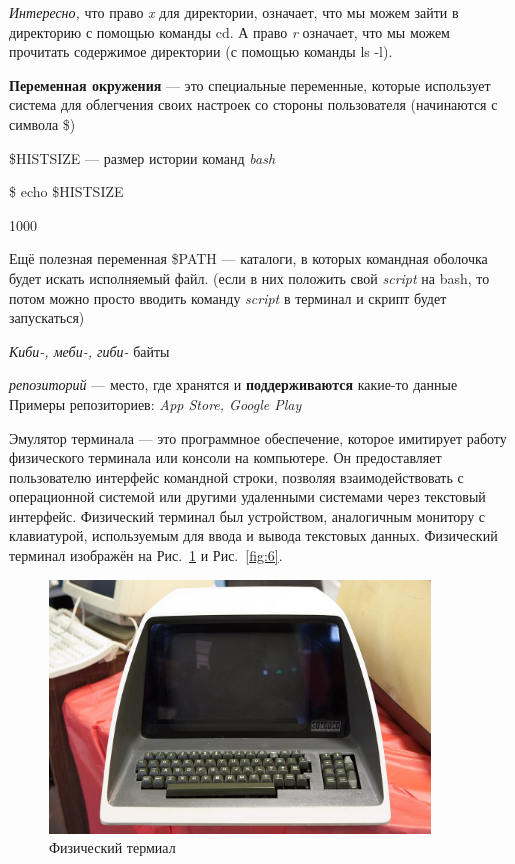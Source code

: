 \documentclass[oneside, final, 14pt]{extreport} %
\begin{document}
\textit{Интересно,} что право \textit{x} для директории, означает, что мы можем зайти в директорию 
с помощью команды cd. А право \textit{r} означает, что мы можем прочитать содержимое директории (с 
помощью команды ls -l).



\textbf{Переменная окружения} --- это специальные переменные, которые использует система для
облегчения своих настроек со стороны пользователя (начинаются с символа \$) 

\$HISTSIZE --- размер истории команд \textit{bash}

\$ echo \$HISTSIZE 

1000

\vspace{\baselineskip}

Ещё полезная переменная \$PATH --- каталоги, в которых командная оболочка 
будет искать исполняемый файл. (если в них положить свой \textit{script} на bash,
то потом можно просто вводить команду \textit{script} в терминал и скрипт будет запускаться)

\textit{Киби-, меби-, гиби-} байты

\textit{репозиторий} --- место, где хранятся и \textbf{поддерживаются} какие-то данные
Примеры репозиториев: \textit{App Store, Google Play}

Эмулятор терминала — это программное обеспечение, которое имитирует работу физического терминала или консоли на компьютере. Он предоставляет пользователю интерфейс командной строки, позволяя взаимодействовать с операционной системой или другими удаленными системами через текстовый интерфейс.
Физический терминал был устройством, аналогичным монитору с клавиатурой, используемым для ввода и вывода текстовых данных. Физический терминал изображён на Рис.~\ref{fig:5} и Рис.~\ref{fig:6}.

\begin{figure}[ht]
    \centering
    \includegraphics[width=0.9\textwidth]{5.png}
    \caption{Физический термиал}
    \label{fig:5}
\end{figure}
\end{document}

